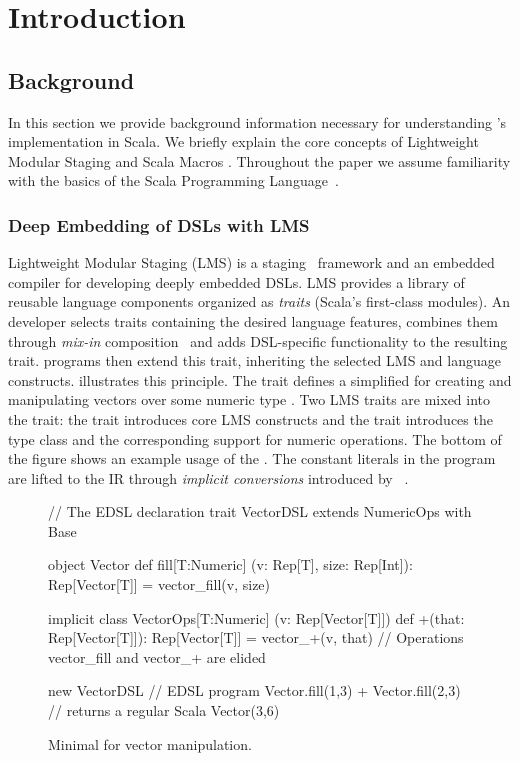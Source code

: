 \chapter{Introduction}

\section{Background}
\label{sec:background}

In this section we provide background information necessary for understanding \tool's
implementation in Scala. We briefly explain the core concepts of Lightweight Modular Staging
\cite{rompf_lightweight_2012,rompf_optimizing_2013} and Scala Macros
\cite{burmako_scala_2013}. Throughout the paper we assume familiarity with
the basics of the Scala Programming Language~\cite{odersky_scala_2004}.

\subsection{Deep Embedding of DSLs with LMS}
\label{subsec:deep-embedding}

Lightweight Modular Staging (LMS) is a
staging~\cite{taha_multi-stage_1997} framework and an embedded
compiler for developing deeply embedded DSLs.  LMS provides a library
of reusable language components organized as \emph{traits} (Scala's
first-class modules).  An \edsl developer selects traits containing
the desired language features, combines them through \emph{mix-in}
composition~\cite{odersky_scalable_2005} and adds DSL-specific
functionality to the resulting \edsl trait.  \edsl programs then
extend this trait, inheriting the selected LMS and \edsl language
constructs.  illustrates this principle.  The trait
 defines a simplified \edsl for creating and
manipulating vectors over some numeric type .  Two LMS traits
are mixed into the  trait: the  trait
introduces core LMS constructs %
and the  trait introduces the  type
class and the corresponding support for numeric operations.  The
bottom of the figure shows an example usage of the \edsl. The constant
literals in the program are lifted to the IR through \emph{implicit
  conversions} introduced by
~\cite{oliveira_type_2010}.

\begin{figure}
\begin{listingtiny}
// The EDSL declaration
trait VectorDSL extends NumericOps with Base {
  object Vector {
    def fill[T:Numeric]
      (v: Rep[T], size: Rep[Int]): Rep[Vector[T]] =
      vector_fill(v, size)
  }

  implicit class VectorOps[T:Numeric]
    (v: Rep[Vector[T]]) {
    def +(that: Rep[Vector[T]]): Rep[Vector[T]] =
      vector_+(v, that)
  }
  // Operations vector_fill and vector_+ are elided
}

new VectorDSL { // EDSL program
  Vector.fill(1,3) + Vector.fill(2,3)
} // returns a regular Scala Vector(3,6)
\end{listingtiny}
\caption{\label{lst:lms} Minimal \edsl for vector manipulation.}
\end{figure}

